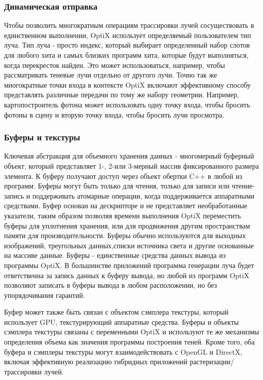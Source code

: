 \subsubsection {Динамическая отправка}
Чтобы позволить многократным операциям трассировки лучей сосуществовать в единственном выполнении, OptiX использует определяемый пользователем тип луча. Тип луча - просто индекс, который выбирает определенный набор слотов для любого хита и самых близких программ хита, которые будут выполняться, когда перекресток найден. Это может использоваться, например, чтобы рассматривать теневые лучи отдельно от другого
лучи. Точно так же многократные точки входа в контексте OptiX включают эффективному способу представлять различные передачи по тому же набору геометрии. Например, картопостроитель фотона может использовать одну точку входа, чтобы бросить фотоны в сцену и вторую точку входа, чтобы бросить лучи просмотра.
\subsubsection{Буферы и текстуры}
Ключевая абстракция для объемного хранения данных - многомерный буферный объект, который представляет 1-, 2-или 3-мерный массив фиксированного размера элемента. К буферу получают доступ через объект обертки C++ в любой из программ. Буферы могут быть только для чтения, только для записи или чтение-запись и поддерживать атомарные операции, когда поддерживается аппаратными средствами. Буфер основан на дескрипторе и не представляет необработанные указатели, таким образом позволяя времени выполнения OptiX переместить буферы для уплотнения хранения, или для продвижения другим пространствам памяти для производительности.
Буферы обычно используются для выходных изображений, треугольных данных,списки источника света и другие основанные на массиве данные. Буферы - единственные средства данных вывода из программы OptiX. В большинстве приложений программа генерации луча будет ответственна за запись данных к буферу вывода, но любой из программ OptiX позволяют записать в буферы вывода в любом расположении, но без упорядочивания гарантий.

Буфер может также быть связан с объектом сэмплера текстуры, который использует GPU, текстурирующий аппаратные средства. Буферы и объекты сэмплера текстуры связаны с переменными OptiX и используют те же механизмы определения объема как значения программы построения теней. Кроме того, оба буфера и сэмплеры текстуры могут взаимодействовать с OpenGL и DirectX, включая эффективную реализацию гибридных приложений растеризации/трассировки лучей.
